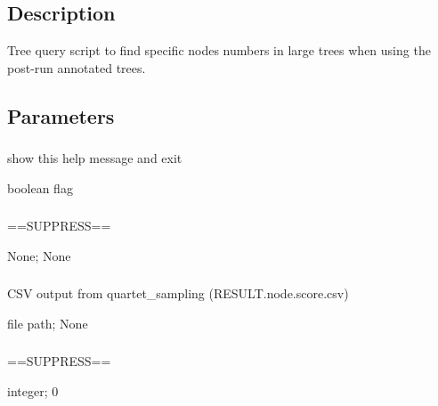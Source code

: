 \documentclass[letterpaper,12pt,english]{sphinxmanual}
\begin{document}
\subsection{Description}
\label{\detokenize{prog_desc:id7}}
Tree query script to find specific nodes numbers in large trees
when using the post-run annotated trees.



\subsection{Parameters}
\label{\detokenize{prog_desc:id8}}

\subsubsection{}
\label{\detokenize{prog_desc:id9}}
 show this help message and exit

 boolean flag


\subsubsection{}
\label{\detokenize{prog_desc:id10}}
 ==SUPPRESS==

 None;  None


\subsubsection{}
\label{\detokenize{prog_desc:data}}
 CSV output from quartet\_sampling (RESULT.node.score.csv)

 file path;  None


\subsubsection{}
\label{\detokenize{prog_desc:id11}}
 ==SUPPRESS==

 integer;  0
\end{document}
